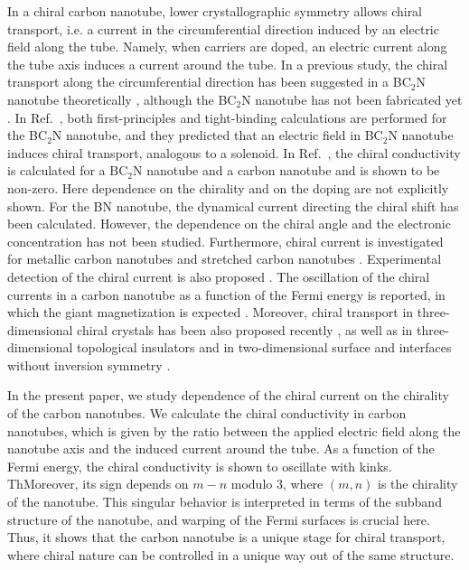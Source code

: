 \documentclass[journal=nalefd,manuscript=article,layout=twocolumn]{achemso}
\begin{document}
In a chiral carbon nanotube, lower crystallographic symmetry allows chiral transport, i.e.
a current in the circumferential direction induced by an electric field along the tube. 
Namely, when carriers are doped, an electric current along the tube axis induces 
a current around the tube. In a previous study, the chiral transport along the circumferential 
direction has been suggested in a BC$_2$N nanotube theoretically \cite{Miyamoto_1994}, 
although the BC$_2$N nanotube has not been fabricated yet 
\cite{Ayala_2010}. In Ref.~\cite{Miyamoto_1994}, both first-principles and 
tight-binding calculations are performed for the BC$_2$N nanotube, and 
they predicted that an electric field in BC$_2$N nanotube induces chiral transport, analogous to a solenoid.
In Ref.~\cite{Miyamoto_1996a}, the chiral conductivity is calculated for a BC$_2$N nanotube and a carbon nanotube and is shown to be non-zero. 
Here dependence on the chirality and on the doping are not explicitly shown. 
For the BN nanotube, the dynamical current directing the chiral shift 
has been calculated. However, the dependence on the chiral angle and the electronic concentration has not been studied\cite{Kral_2000}. 
Furthermore, chiral current is investigated for metallic carbon nanotubes \cite{Tsuji_2007} and stretched carbon nanotubes \cite{Miyamoto_1996b}. Experimental  
detection of the chiral current is also proposed \cite{Miyamoto_1999}. 
The oscillation of the chiral currents in a carbon nanotube as a function of the Fermi energy 
is reported, in which the giant magnetization is expected \cite{Lambert_2008}. 
Moreover, chiral transport in 
three-dimensional chiral crystals has been also proposed recently \cite{Yoda_2015,Yoda_2018}, as well as in three-dimensional topological insulators \cite{Osumi_2021} and in two-dimensional surface and interfaces without inversion symmetry \cite{Hara_2020}.

In the present paper, we study dependence of the chiral current on the chirality of the carbon nanotubes. 
We calculate the chiral conductivity in carbon nanotubes, which is given by the
ratio between the applied electric field along the nanotube axis and the induced current around the tube.
As a function of the Fermi energy, the chiral conductivity 
is shown to 
oscillate with kinks. ThMoreover, its sign depends on $m-n$ modulo 3, where $(m,n)$ is the chirality of the nanotube. This singular behavior is interpreted in terms of the subband structure of
the nanotube, and warping of the Fermi surfaces is crucial here.
Thus, it shows that the carbon nanotube is a unique stage for chiral transport, where chiral nature can be controlled in a unique way out of the same structure. 
\end{document}

